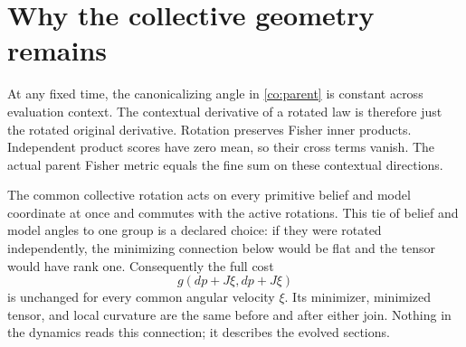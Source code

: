 \section{Why the collective geometry remains}

At any fixed time, the canonicalizing angle in \cref{co:parent} is constant across evaluation context. The contextual derivative of a rotated law is therefore just the rotated original derivative. Rotation preserves Fisher inner products. Independent product scores have zero mean, so their cross terms vanish. The actual parent Fisher metric equals the fine sum on these contextual directions.

The common collective rotation acts on every primitive belief and model coordinate at once and commutes with the active rotations. This tie of belief and model angles to one group is a declared choice: if they were rotated independently, the minimizing connection below would be flat and the tensor would have rank one. Consequently the full cost
\begin{equation}
g(dp+J\xi,dp+J\xi)
\end{equation}
is unchanged for every common angular velocity $\xi$. Its minimizer, minimized tensor, and local curvature are the same before and after either join. Nothing in the dynamics reads this connection; it describes the evolved sections.

